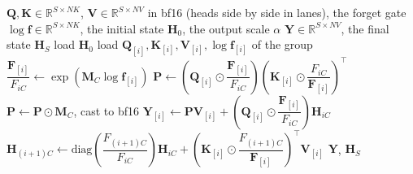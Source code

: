 \caption{Chunkwise Gated Linear Attention forward: one Pallas program (one batch element).}
\begin{algorithmic}
\REQUIRE $\mathbf{Q}, \mathbf{K} \in \mathbb{R}^{S \times NK}$, $\mathbf{V} \in \mathbb{R}^{S \times NV}$ in bf16 (heads side by side in lanes), the forget gate $\log \boldsymbol f \in \mathbb{R}^{S \times NK}$, the initial state $\mathbf{H}_0$, the output scale $\alpha$
\ENSURE $\mathbf{Y} \in \mathbb{R}^{S \times NV}$, the final state $\mathbf{H}_S$
\STATE load $\mathbf{H}_0$ 
\STATE load $\mathbf{Q}_{[i]}, \mathbf{K}_{[i]}, \mathbf{V}_{[i]}, \log \boldsymbol f_{[i]}$ of the group 
\STATE $\dfrac{\boldsymbol F_{[i]}}{F_{iC}} \gets \exp\left(\mathbf{M}_C \log \boldsymbol f_{[i]}\right)$ 
\STATE $\mathbf{P} \gets \left(\mathbf{Q}_{[i]} \odot \dfrac{\boldsymbol F_{[i]}}{F_{iC}}\right)\left(\mathbf{K}_{[i]} \odot \dfrac{F_{iC}}{\boldsymbol F_{[i]}}\right)^\top$ 
\STATE $\mathbf{P} \gets \mathbf{P} \odot \mathbf{M}_C$, cast to bf16 
\STATE $\mathbf{Y}_{[i]} \gets \mathbf{P} \mathbf{V}_{[i]} + \left(\mathbf{Q}_{[i]} \odot \dfrac{\boldsymbol F_{[i]}}{F_{iC}}\right) \mathbf{H}_{iC}$
\STATE $\mathbf{H}_{(i+1)C} \gets \mathrm{diag}\!\left(\dfrac{F_{(i+1)C}}{F_{iC}}\right) \mathbf{H}_{iC} + \left(\mathbf{K}_{[i]} \odot \dfrac{F_{(i+1)C}}{\boldsymbol F_{[i]}}\right)^\top \mathbf{V}_{[i]}$ 
\ENDFOR
\ENDFOR
\RETURN $\mathbf{Y}$, $\mathbf{H}_S$
\end{algorithmic}
